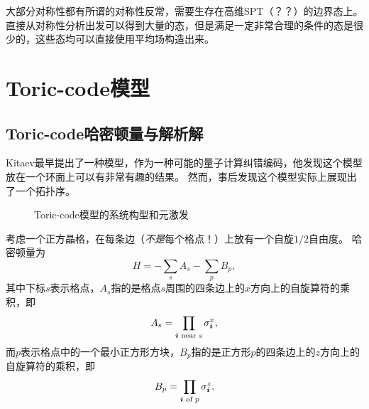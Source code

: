 大部分对称性都有所谓的对称性反常，需要生存在高维SPT（？？）的边界态上。
直接从对称性分析出发可以得到大量的态，但是满足一定非常合理的条件的态是很少的，这些态均可以直接使用平均场构造出来。

\section{Toric-code模型}

\subsection{Toric-code哈密顿量与解析解}

Kitaev最早提出了一种模型，作为一种可能的量子计算纠错编码，他发现这个模型放在一个环面上可以有非常有趣的结果。
然而，事后发现这个模型实际上展现出了一个拓扑序。

\begin{figure}
    \centering
    \vfill
    \caption{Toric-code模型的系统构型和元激发}
\end{figure}

考虑一个正方晶格，在每条边（\emph{不是}每个格点！）上放有一个自旋$1/2$自由度。
哈密顿量为
\begin{equation}
    {H} = - \sum_s {A}_s - \sum_p {B}_p,
    \label{eq:toric-code-hamiltonian}
\end{equation}
其中下标$s$表示格点，${A}_s$指的是格点$s$周围的四条边上的$x$方向上的自旋算符的乘积，即
\begin{equation}
    {A}_s = \prod_{\vb*{i} \text{ near } s} {\sigma}_{\vb*{i}}^x,
\end{equation}
而$p$表示格点中的一个最小正方形方块，${B}_p$指的是正方形$p$的四条边上的$z$方向上的自旋算符的乘积，即
\begin{equation}
    {B}_p = \prod_\text{$\vb*{i}$ of $p$} {\sigma}_{\vb*{i}}^z.
\end{equation}

